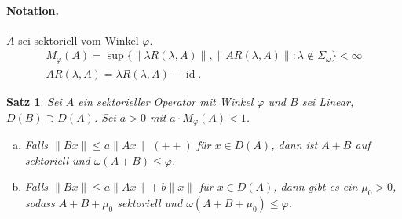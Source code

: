 \documentclass[12pt]{extreport} %
\newtheorem{Satz}{Satz}[subsection]
\DeclareMathOperator{\id}{id}
\numberwithin{equation}{section}
\newcommand{\om}{\omega}
\newcommand{\m}{\cdot}
\begin{document}
	\paragraph{Notation.} $A$ sei sektoriell vom Winkel $\varphi$. 
	\begin{align*}
		M_\varphi(A) = \sup \{\|\lambda R(\lambda, A)\|, \|A R(\lambda, A)\|: \lambda \notin \Sigma_\om\} <\infty\\
		AR(\lambda, A) = \lambda R(\lambda, A)-\id.
	\end{align*}
	
	\begin{Satz}
		Sei $A$ ein sektorieller Operator mit Winkel $\varphi$ und $B$ sei Linear, $D(B)\supset D(A)$. Sei $a>0$ mit $a\m M_\varphi(A)<1$.
		\begin{enumerate}[a)]
			\item Falls $\|Bx\|\leq a\|Ax\|$ $(++)$ für $x\in D(A)$, dann ist $A+B$ auf sektoriell und $\om(A+B)\leq \varphi$.
			\item Falls $\|Bx\|\leq a\|Ax\| +b\|x\|$ für $x\in D(A)$, dann gibt es ein $\mu_0>0$, sodass $A+B+\mu_0$ sektoriell und $\om(A+B+\mu_0)\leq \varphi$.
		\end{enumerate}
	\end{Satz}
	
\end{document}
